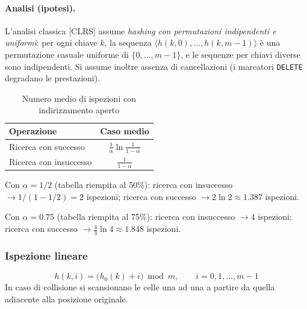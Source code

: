 \paragraph{Analisi (ipotesi).}
L'analisi classica [CLRS] assume \emph{hashing con permutazioni indipendenti e
	uniformi}: per ogni chiave $k$, la sequenza
$\langle h(k,0), \ldots, h(k,m-1)\rangle$ è una permutazione casuale uniforme
di $\{0,\ldots,m-1\}$, e le sequenze per chiavi diverse sono indipendenti.
Si assume inoltre assenza di cancellazioni (i marcatori \texttt{DELETE}
degradano le prestazioni).

\begin{table}[ht]
	\centering
	\caption{Numero medio di ispezioni con indirizzamento aperto}
	\begin{tabular}{lc}
		\toprule
		\textbf{Operazione}    & \textbf{Caso medio}                      \\
		\midrule
		Ricerca con successo   & $\frac{1}{\alpha}\ln\frac{1}{1-\alpha}$  \\[6pt]
		Ricerca con insuccesso & $\frac{1}{1-\alpha}$                     \\
		\bottomrule
	\end{tabular}
\end{table}

\begin{esempio}
	Con $\alpha = 1/2$ (tabella riempita al 50\%):
	ricerca con insuccesso $\to 1/(1-1/2) = 2$ ispezioni;
	ricerca con successo $\to 2\ln 2 \approx 1.387$ ispezioni.
	
	Con $\alpha = 0.75$ (tabella riempita al 75\%):
	ricerca con insuccesso $\to 4$ ispezioni;
	ricerca con successo $\to \frac{4}{3}\ln 4 \approx 1.848$ ispezioni.
\end{esempio}

\subsubsection{Ispezione lineare}

\begin{definizione}
	\[
	h(k, i) = \bigl(h_0(k) + i\bigr) \bmod m, \qquad i = 0, 1, \ldots, m-1
	\]
	In caso di collisione si scansionano le celle una ad una a partire da
	quella adiacente alla posizione originale.
\end{definizione}

